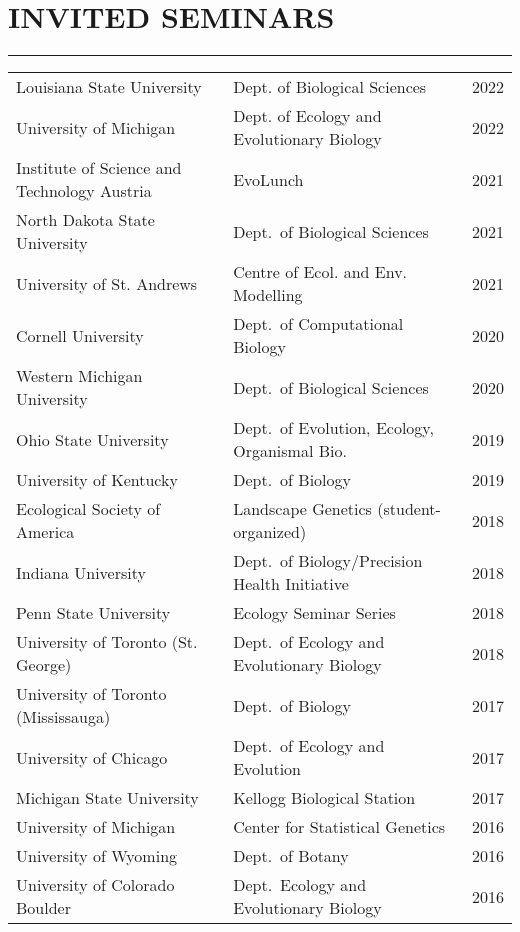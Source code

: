 \documentclass{article}
\begin{document}
\section*{INVITED SEMINARS}
\vspace{-0.6cm}
\rule{470pt}{0.4pt}
%
\begin{longtable}{>{\everypar{\hangindent1cm}}p{}p{}p{}}
%
Louisiana State University & Dept. of Biological Sciences & \hfill 2022 \\
%
University of Michigan & Dept. of Ecology and Evolutionary Biology & \hfill 2022 \\
%
Institute of Science and Technology Austria & EvoLunch & \hfill 2021 \\
%
North Dakota State University & Dept.\ of Biological Sciences & \hfill 2021 \\
%
University of St. Andrews & Centre of Ecol. and Env. Modelling & \hfill 2021 \\
%
Cornell University & Dept.\ of Computational Biology & \hfill 2020 \\
%
Western Michigan University & Dept.\ of Biological Sciences & \hfill 2020 \\
%
Ohio State University & Dept.\ of Evolution, Ecology, Organismal Bio. & \hfill 2019 \\
%
University of Kentucky & Dept.\ of Biology & \hfill 2019 \\
%
Ecological Society of America & Landscape Genetics (student-organized) & \hfill 2018 \\
%
Indiana University & Dept.\ of Biology/Precision Health Initiative & \hfill 2018 \\
%
Penn State University & Ecology Seminar Series & \hfill 2018 \\
%
University of Toronto (St. George) & Dept.\ of Ecology and Evolutionary Biology & \hfill 2018 \\
%
University of Toronto (Mississauga) & Dept.\ of Biology & \hfill 2017 \\
%
University of Chicago & Dept.\ of Ecology and Evolution & \hfill 2017 \\
%
Michigan State University & Kellogg Biological Station & \hfill 2017 \\
%
University of Michigan & Center for Statistical Genetics & \hfill 2016 \\
%
University of Wyoming & Dept.\ of Botany & \hfill 2016 \\
%
University of Colorado Boulder & Dept.\ Ecology and Evolutionary Biology & \hfill 2016 \\

\end{longtable}
\end{document}
